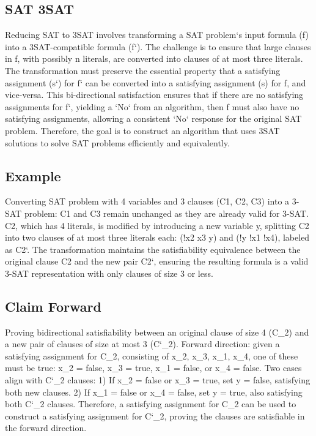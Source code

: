 \subsection*{SAT 3SAT}
Reducing SAT to 3SAT involves transforming a SAT problem`s input formula (f) into a 3SAT-compatible formula (f`).
The challenge is to ensure that large clauses in f, with possibly n literals, are converted into clauses of at most three literals.
The transformation must preserve the essential property that a satisfying assignment (s`) for f` can be converted into a satisfying assignment (s) for f, and vice-versa.
This bi-directional satisfaction ensures that if there are no satisfying assignments for f`, yielding a `No` from an algorithm, then f must also have no satisfying assignments, allowing a consistent `No` response for the original SAT problem.
Therefore, the goal is to construct an algorithm that uses 3SAT solutions to solve SAT problems efficiently and equivalently.

\subsection*{Example}
Converting SAT problem with 4 variables and 3 clauses (C1, C2, C3) into a 3-SAT problem: C1 and C3 remain unchanged as they are already valid for 3-SAT\@.
C2, which has 4 literals, is modified by introducing a new variable y, splitting C2 into two clauses of at most three literals each: (!x2  x3  y) and (!y  !x1  !x4), labeled as C2`.
The transformation maintains the satisfiability equivalence between the original clause C2 and the new pair C2`, ensuring the resulting formula is a valid 3-SAT representation with only clauses of size 3 or less.

\subsection*{Claim  Forward}
Proving bidirectional satisfiability between an original clause of size 4 (C\_2) and a new pair of clauses of size at most 3 (C`\_2).
Forward direction: given a satisfying assignment for C\_2, consisting of x\_2, x\_3, x\_1, x\_4, one of these must be true: x\_2 = false, x\_3 = true, x\_1 = false, or x\_4 = false.
Two cases align with C`\_2 clauses: 1) If x\_2 = false or x\_3 = true, set y = false, satisfying both new clauses.
2) If x\_1 = false or x\_4 = false, set y = true, also satisfying both C`\_2 clauses.
Therefore, a satisfying assignment for C\_2 can be used to construct a satisfying assignment for C`\_2, proving the clauses are satisfiable in the forward direction.

